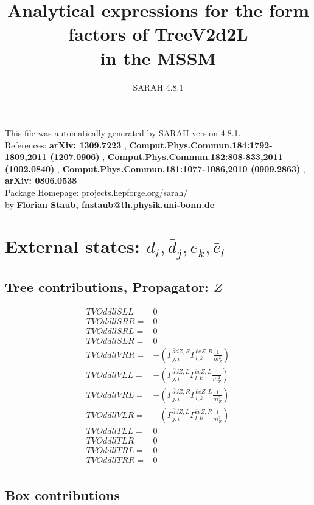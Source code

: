 \documentclass[A4,landscape]{article}
\begin{document}
\title{Analytical expressions for the form factors of TreeV2d2L\\ in the MSSM } 
 \author{SARAH 4.8.1} 
 \maketitle 
 \vspace{10cm} 
This file was automatically generated by SARAH version 4.8.1.  \\ 
References: {\bf arXiv: 1309.7223 }, {\bf Comput.Phys.Commun.184:1792-1809,2011 (1207.0906) }, {\bf Comput.Phys.Commun.182:808-833,2011 (1002.0840) }, {\bf Comput.Phys.Commun.181:1077-1086,2010 (0909.2863) }, {\bf arXiv: 0806.0538 } \\ 
Package Homepage: projects.hepforge.org/sarah/ \\ 
by {\bf Florian Staub, fnstaub@th.physik.uni-bonn.de} 
 \pagebreak 
 \tableofcontents 
 \pagebreak 
\section{External states: ${d_{{i}}, \bar{d}_{{j}}, e_{{k}}, \bar{e}_{{l}}}$} 
\subsection{Tree contributions, Propagator: $Z$} 

\begin{align} 
  TVOddllSLL= & 0 \\ 
  TVOddllSRR= & 0 \\ 
  TVOddllSRL= & 0 \\ 
  TVOddllSLR= & 0 \\ 
  TVOddllVRR= & -(\Gamma^{\bar{d}d Z ,R}_{j, i} \Gamma^{\bar{e}e Z ,R}_{l, k} \frac{1}{m^2_{Z}}) \\ 
  TVOddllVLL= & -(\Gamma^{\bar{d}d Z ,L}_{j, i} \Gamma^{\bar{e}e Z ,L}_{l, k} \frac{1}{m^2_{Z}}) \\ 
  TVOddllVRL= & -(\Gamma^{\bar{d}d Z ,R}_{j, i} \Gamma^{\bar{e}e Z ,L}_{l, k} \frac{1}{m^2_{Z}}) \\ 
  TVOddllVLR= & -(\Gamma^{\bar{d}d Z ,L}_{j, i} \Gamma^{\bar{e}e Z ,R}_{l, k} \frac{1}{m^2_{Z}}) \\ 
  TVOddllTLL= & 0 \\ 
  TVOddllTLR= & 0 \\ 
  TVOddllTRL= & 0 \\ 
  TVOddllTRR= & 0 \\ 
\end{align} 
\subsection{Box contributions} 
\end{document}
